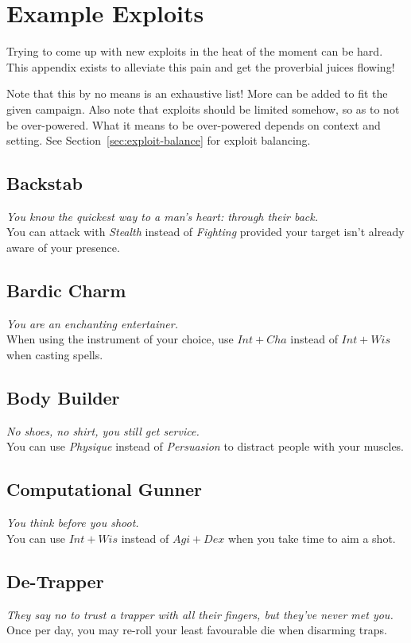 \chapter{Example Exploits}\label{app:exploits}
Trying to come up with new exploits in the heat of the moment can be hard.
This appendix exists to alleviate this pain and get the proverbial juices flowing!

Note that this by no means is an exhaustive list!
More can be added to fit the given campaign.
Also note that exploits should be limited somehow, so as to not be over-powered. What it means to be over-powered depends on context and setting. See Section~\ref{sec:exploit-balance} for exploit balancing.

\section{Backstab}
\textit{You know the quickest way to a man's heart: through their back.}\\
You can attack with \textit{Stealth} instead of \textit{Fighting} provided your target isn't already aware of your presence.

\section{Bardic Charm}
\textit{You are an enchanting entertainer.}\\
When using the instrument of your choice, use $Int+Cha$ instead of $Int+Wis$ when casting spells.

\section{Body Builder}
\textit{No shoes, no shirt, you still get service.}\\
You can use \textit{Physique} instead of \textit{Persuasion} to distract people with your muscles.

\section{Computational Gunner}
\textit{You think before you shoot.}\\
You can use $Int+Wis$ instead of $Agi+Dex$ when you take time to aim a shot.

\section{De-Trapper}
\textit{They say no to trust a trapper with all their fingers, but they've never met you.}\\
Once per day, you may re-roll your least favourable die when disarming traps.

